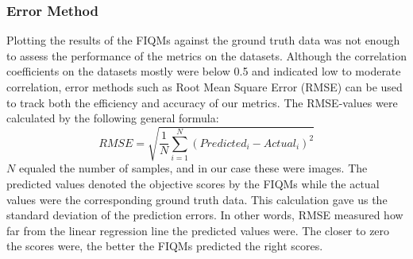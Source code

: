 \subsubsection{Error Method}
Plotting the results of the FIQMs against the ground truth data was not enough to assess the performance of the metrics on the datasets. Although the correlation coefficients on the datasets mostly were below 0.5 and indicated low to moderate correlation, error methods such as Root Mean Square Error (RMSE) can be used to track both the efficiency and accuracy of our metrics. The RMSE-values were calculated by the following general formula: 
\begin{equation}
    RMSE = \sqrt{\frac{1}{N}\sum _{i=1}^{N}(Predicted_{i} - Actual_{i})^2}
\end{equation}
$N$ equaled the number of samples, and in our case these were images. The predicted values denoted the objective scores by the FIQMs while the actual values were the corresponding ground truth data. This calculation gave us the standard deviation of the prediction errors. In other words, RMSE measured how far from the linear regression line the predicted values were. The closer to zero the scores were, the better the FIQMs predicted the right scores.
\newpage

